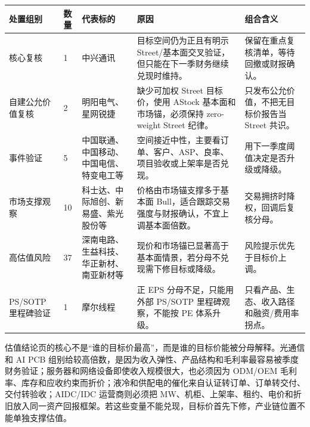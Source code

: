 \begin{exhibitbox}
\begin{tabularx}{\linewidth}{L{2.5cm}R{0.8cm}L{3.1cm}X X}
\toprule
\textbf{处置组别} & \textbf{数量} & \textbf{代表标的} & \textbf{原因} & \textbf{组合含义}\\
\midrule
核心复核 & 1 & 中兴通讯 & 目标空间仍为正且有明示 Street/基本面交叉验证，但只能在下一季财务继续兑现时维持。 & 保留在重点复核清单，等待回撤或财报确认。\\
自建公允价值复核 & 2 & 明阳电气、星网锐捷 & 缺少可加权 Street 目标价，使用 AStock 基本面和市场锚，必须保持 zero-weight Street 纪律。 & 只发布公允价值，不把无目标价报告当 Street 共识。\\
事件验证 & 5 & 中国联通、中国移动、中国电信、特变电工等 & 空间接近中性，主要看订单、客户、ASP、良率、项目验收或上架率是否兑现。 & 用下一季度阈值决定是否升级或降级。\\
市场支撑观察 & 10 & 科士达、中际旭创、新易盛、紫光股份等 & 价格由市场锚支撑多于基本面 Bull，适合跟踪交易强度与财报确认，不宜上调基本面倍数。 & 交易拥挤时降权，回调后复核分母。\\
高估值风险 & 37 & 深南电路、生益科技、华正新材、南亚新材等 & 现价和市场锚已显著高于基本面情景，若分母不兑现需下修目标或降级。 & 风险提示优先于目标价上调。\\
PS/SOTP 里程碑验证 & 1 & 摩尔线程 & 正 EPS 分母不足，只能用外部 PS/SOTP 里程碑观察，不能按 PE 体系升级。 & 只看产品、生态、收入路径和融资/费用率拐点。\\
\bottomrule
\end{tabularx}
\end{exhibitbox}

估值结论页的核心不是“谁的目标价最高”，而是谁的目标价能被分母解释。光通信和 AI PCB 组别给较高倍数，是因为收入弹性、产品结构和毛利率最容易被季度财务验证；服务器和网络设备即使收入规模很大，也必须因为 ODM/OEM 毛利率、库存和应收约束而折价；液冷和供配电的催化来自认证转订单、订单转交付、交付转验收；AIDC/IDC 运营商则必须把 MW、机柜、上架率、租约、电价和折旧放入同一资产回报框架。若这些变量不能兑现，目标价首先下修，产业链位置不能单独支撑估值。

